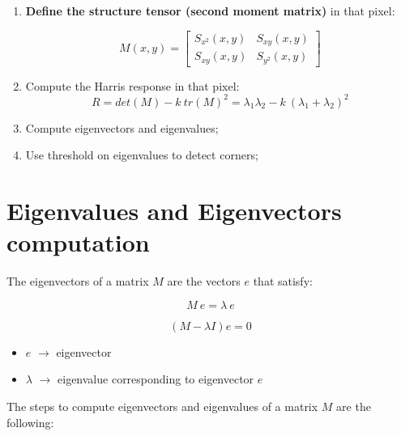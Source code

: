 \documentclass{article}
\begin{document}
\begin{enumerate}[start=0]
    \item \textbf{Define the structure tensor (second moment matrix)} in that pixel:

    \begin{equation*}
    M(x,y) = 
    \begin{bmatrix}
    S_{x^2}(x,y) & S_{xy}(x,y) \\
    S_{xy}(x,y) & S_{y^2}(x,y)
    \end{bmatrix}
    \end{equation*}
    
    \item Compute the Harris response in that pixel:
    \begin{equation*}
        R = det(M) - k\ tr(M)^2 = \lambda_1 \lambda_2 - k\ (\lambda_1 + \lambda_2)^2
    \end{equation*}
    
    \item Compute eigenvectors and eigenvalues;
    
    \item Use threshold on eigenvalues to detect corners;

\end{enumerate}

\newpage

\section*{Eigenvalues and Eigenvectors computation}

The eigenvectors of a matrix $M$ are the vectors $e$ that satisfy:

\begin{equation*}
    M\ e = \lambda\ e
\end{equation*}

\begin{equation*}
    (M - \lambda I)e = 0
\end{equation*}

\begin{itemize}
    \item \textbf{$e$} $\rightarrow$ eigenvector
    \item \textbf{$\lambda$} $\rightarrow$ eigenvalue corresponding to eigenvector $e$
\end{itemize}

The steps to compute eigenvectors and eigenvalues of a matrix $M$ are the following:
\end{document}
